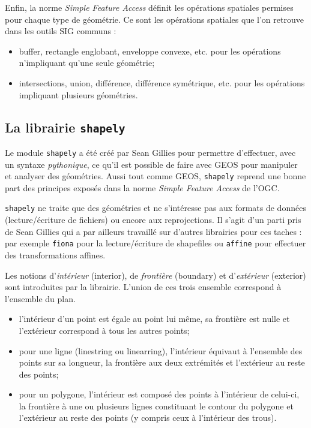 \documentclass[11pt]{article}
\newcommand{\passthrough}[1]{#1}
\def\tightlist{}
\begin{document}
Enfin, la norme \emph{Simple Feature Access} définit les opérations
spatiales permises pour chaque type de géométrie. Ce sont les opérations
spatiales que l'on retrouve dans les outils SIG communs :

\begin{itemize}
\tightlist
\item
  buffer, rectangle englobant, enveloppe convexe, etc. pour les
  opérations n'impliquant qu'une seule géométrie;
\item
  intersections, union, différence, différence symétrique, etc. pour les
  opérations impliquant plusieurs géométries.
\end{itemize}

\hypertarget{la-librairie-shapely}{%
\subsection{\texorpdfstring{La librairie
\texttt{shapely}}{La librairie shapely}}\label{la-librairie-shapely}}

Le module \passthrough{\lstinline!shapely!} a été créé par Sean Gillies
pour permettre d'effectuer, avec un syntaxe \emph{pythonique}, ce qu'il
est possible de faire avec GEOS pour manipuler et analyser des
géométries. Aussi tout comme GEOS, \passthrough{\lstinline!shapely!}
reprend une bonne part des principes exposés dans la norme \emph{Simple
Feature Access} de l'OGC.

\passthrough{\lstinline!shapely!} ne traite que des géométries et ne
s'intéresse pas aux formats de données (lecture/écriture de fichiers) ou
encore aux reprojections. Il s'agit d'un parti pris de Sean Gillies qui
a par ailleurs travaillé sur d'autres librairies pour ces taches : par
exemple \passthrough{\lstinline!fiona!} pour la lecture/écriture de
shapefiles ou \passthrough{\lstinline!affine!} pour effectuer des
transformations affines.

Les notions d'\emph{intérieur} (interior), de \emph{frontière}
(boundary) et d'\emph{extérieur} (exterior) sont introduites par la
librairie. L'union de ces trois ensemble correspond à l'ensemble du
plan.

\begin{itemize}
\tightlist
\item
  l'intérieur d'un point est égale au point lui même, sa frontière est
  nulle et l'extérieur correspond à tous les autres points;
\item
  pour une ligne (linestring ou linearring), l'intérieur équivaut à
  l'ensemble des points sur sa longueur, la frontière aux deux
  extrémités et l'extérieur au reste des points;
\item
  pour un polygone, l'intérieur est composé des points à l'intérieur de
  celui-ci, la frontière à une ou plusieurs lignes constituant le
  contour du polygone et l'extérieur au reste des points (y compris ceux
  à l'intérieur des trous).
\end{itemize}
\end{document}
